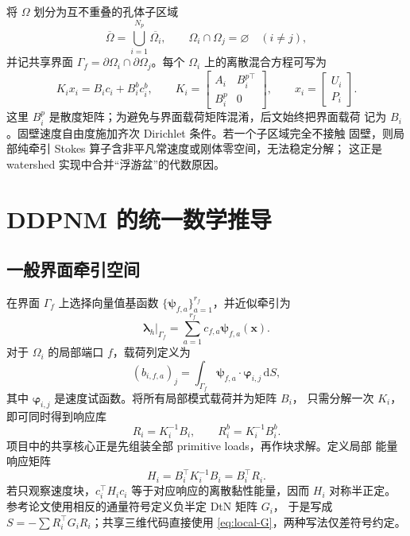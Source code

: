 \documentclass[UTF8,zihao=-4]{ctexart}
\newcommand{\traction}{\bm\lambda}
\newcommand{\dd}{\,\mathrm d}
\begin{document}
将 $\Omega$ 划分为互不重叠的孔体子区域
\begin{equation}
  \overline\Omega=\bigcup_{i=1}^{N_p}\overline{\Omega_i},\qquad
  \Omega_i\cap\Omega_j=\varnothing\quad(i\ne j),
\end{equation}
并记共享界面 $\Gamma_f=\partial\Omega_i\cap\partial\Omega_j$。每个
$\Omega_i$ 上的离散混合方程可写为
\begin{equation}\label{eq:local-matrix}
K_i x_i=B_i c_i+B_i^b c_i^b,\qquad
  K_i=\begin{bmatrix}A_i&B_i^{p\top}\\B_i^p&0\end{bmatrix},
  \qquad x_i=\begin{bmatrix}U_i\\P_i\end{bmatrix}.
\end{equation}
这里 $B_i^p$ 是散度矩阵；为避免与界面载荷矩阵混淆，后文始终把界面载荷
记为 $B_i$。固壁速度自由度施加齐次 Dirichlet 条件。若一个子区域完全不接触
固壁，则局部纯牵引 Stokes 算子含非平凡常速度或刚体零空间，无法稳定分解；
这正是 watershed 实现中合并``浮游盆''的代数原因。

\section{DDPNM 的统一数学推导}

\subsection{一般界面牵引空间}

在界面 $\Gamma_f$ 上选择向量值基函数
$\{\bm\psi_{f,a}\}_{a=1}^{r_f}$，并近似牵引为
\begin{equation}\label{eq:trace-basis}
  \traction_h\big|_{\Gamma_f}
  =\sum_{a=1}^{r_f}c_{f,a}\bm\psi_{f,a}(\bm x).
\end{equation}
对于 $\Omega_i$ 的局部端口 $f$，载荷列定义为
\begin{equation}\label{eq:load-column}
  (b_{i,f,a})_j
  =\int_{\Gamma_f}\bm\psi_{f,a}\cdot\bm\varphi_{i,j}\dd S,
\end{equation}
其中 $\bm\varphi_{i,j}$ 是速度试函数。将所有局部模式载荷并为矩阵 $B_i$，
只需分解一次 $K_i$，即可同时得到响应库
\begin{equation}\label{eq:response}
  R_i=K_i^{-1}B_i,\qquad R_i^b=K_i^{-1}B_i^b.
\end{equation}
项目中的共享核心正是先组装全部 primitive loads，再作块求解。定义局部
能量响应矩阵
\begin{equation}\label{eq:local-G}
  H_i=B_i^\top K_i^{-1}B_i=B_i^\top R_i.
\end{equation}
若只观察速度块，$c_i^\top H_i c_i$ 等于对应响应的离散黏性能量，因而
$H_i$ 对称半正定。参考论文使用相反的通量符号定义负半定 DtN 矩阵 $G_i$，
于是写成 $S=-\sum R_i^\top G_iR_i$；共享三维代码直接使用
\eqref{eq:local-G}，两种写法仅差符号约定。
\end{document}
